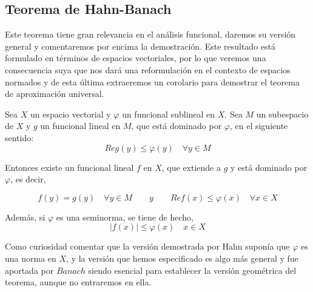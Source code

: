 \subsection{Teorema de Hahn-Banach}
    
    Este teorema tiene gran relevancia en el análisis funcional, daremos su versión general y comentaremos por encima la demostración. Este resultado está formulado en términos de espacios vectoriales, por lo que veremos una consecuencia suya que nos dará una reformulación en el contexto de espacios normados y de esta última extraeremos un corolario para demostrar el teorema de aproximación universal.\\ 
    
    
    \begin{teorema}\label{teorema:HB}
    Sea $X$ un espacio vectorial y $\varphi$ un funcional sublineal en $X$. Sea $M$ un subespacio de $X$ y $g$ un funcional lineal en $M$, que está dominado por $\varphi$, en el siguiente sentido:
    \begin{equation}
        Re g(y) \leq \varphi(y) \quad \forall y \in M
    \end{equation}
    
    \noindent Entonces existe un funcional lineal $f$ en $X$, que extiende a $g$ y está dominado por $\varphi$, es decir,
    
    \begin{equation}
        f(y) = g(y) \quad \forall y \in M \qquad y \qquad Re f(x) \leq \varphi(x) \quad \forall x \in X
    \end{equation}
    
    \noindent Además, si $\varphi$ es una seminorma, se tiene de hecho, 
    \begin{equation}
        |f(x)| \leq \varphi(x) \quad x \in X
    \end{equation}
    \end{teorema}
    
    Como curiosidad comentar que la versión demostrada por Hahn suponía que $\varphi$ es una norma en $X$, y la versión que hemos especificado es algo más general y fue aportada por $Banach$ siendo esencial para establecer la versión geométrica del teorema, aunque no entraremos en ella. \\
    
